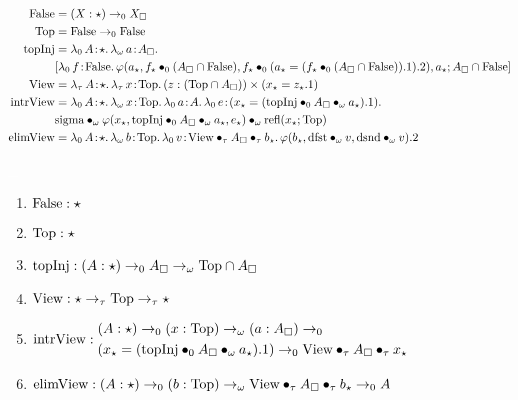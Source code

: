 \begin{align*}
    \pFalse &= (X:\star) \to_0 X_\square \\
    \pTop &= \pFalse \to_0 \pFalse \\
    \ptopInj &= \abs{\lambda_0}{A}{\star}{
        \abs{\lambda_\omega}{a}{A_\square}{
            \\ &[
                \abs{\lambda_0}{f}{\pFalse}{
                    \varphi(a_\star,
                        \app{f_\star}{0}{(A_\square \cap \pFalse)},
                        \app{f_\star}{0}{(a_\star = (\app{f_\star}{0}{(A_\square \cap \pFalse)}).1 )}.2 )
                },
                a_\star;
                A_\square \cap \pFalse
            ]
        }
    } \\
    \pView &= \abs{\lambda_\tau}{A}{\star}{
        \abs{\lambda_\tau}{x}{\pTop}{
            (z : (\pTop \cap A_\square)) \times (x_\star = z_\star.1)
        }
    } \\
    \pintrView &= \abs{\lambda_0}{A}{\star}{
        \abs{\lambda_\omega}{x}{\pTop}{
            \abs{\lambda_0}{a}{A}{
                \abs{\lambda_0}{e}{(x_\star = (\apptwo{\ptopInj}{0}{A_\square}{\omega}{a_\star}).1)}{
                    \\ &\apptwo{\psigma}
                        {\omega}{\varphi(x_\star, \apptwo{\ptopInj}{0}{A_\square}{\omega}{a_\star}, e_\star)}
                        {\omega}{\prefl(x_\star; \pTop)}
                }
            }
        }
    } \\
    \pelimView &= \abs{\lambda_0}{A}{\star}{
        \abs{\lambda_\omega}{b}{\pTop}{
            \abs{\lambda_0}{v}{\apptwo{\pView}{\tau}{A_\square}{\tau}{b_\star}}{
                \varphi(b_\star, \app{\pdfst}{\omega}{v}, \app{\pdsnd}{\omega}{v}).2
            }
        }
    }
\end{align*}

\begin{theorem}
    \label{lem:2:view_derivations}
    \textcolor{white}{\_}
    \begin{enumerate}
        \item $\textnormal{False} : \star$
        \item $\textnormal{Top} : \star$
        \item $\textnormal{topInj} : (A:\star) \to_0 A_\square \to_\omega \textnormal{Top} \cap A_\square$
        \item $\textnormal{View} : \star \to_\tau \textnormal{Top} \to_\tau \star$
        \item {
            $
                \textnormal{intrView} : 
                \begin{aligned}
                    &(A:\star) \to_0 (x:\textnormal{Top}) \to_\omega (a:A_\square) \to_0
                        \\ &(x_\star = (\textnormal{topInj} \bullet_{0} A_\square \bullet_{\omega} a_\star).1) \to_0 \textnormal{View} \bullet_{\tau} A_\square \bullet_{\tau} x_\star
                \end{aligned}
            $
        }
        \item $\textnormal{elimView} : (A:\star) \to_0 (b:\textnormal{Top}) \to_\omega \textnormal{View} \bullet_{\tau} A_\square \bullet_{\tau} b_\star \to_0 A$
    \end{enumerate}
\end{theorem}
